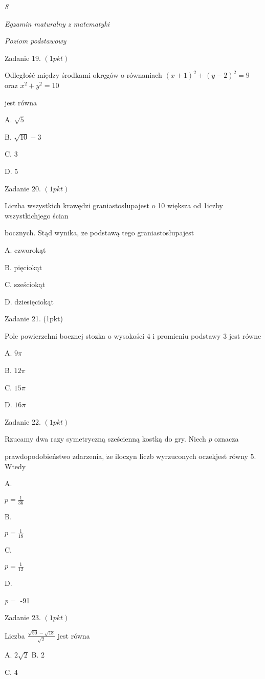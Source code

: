 \documentclass[a4paper,12pt]{article}
\begin{document}
{\it 8}

{\it Egzamin maturalny z matematyki}

{\it Poziom podstawowy}

Zadanie 19. $(1pkt)$

Odległość między środkami okręgów o równaniach $(x+1)^{2}+(y-2)^{2}=9$ oraz $x^{2}+y^{2}=10$

jest równa

A. $\sqrt{5}$

B. $\sqrt{10}-3$

C. 3

D. 5

Zadanie 20. $(1pkt)$

Liczba wszystkich krawędzi graniastosłupajest o 10 większa od 1iczby wszystkichjego ścian

bocznych. Stąd wynika, $\dot{\mathrm{z}}\mathrm{e}$ podstawą tego graniastosłupajest

A. czworokąt

B. pięciokąt

C. sześciokąt

D. dziesięciokąt

Zadanie 21. (1pkt)

Pole powierzchni bocznej stozka o wysokości 4 i promieniu podstawy 3 jest równe

A. $ 9\pi$

B. $ 12\pi$

C. $ 15\pi$

D. $ 16\pi$

Zadanie 22. $(1pkt)$

Rzucamy dwa razy symetryczną sześcienną kostką do gry. Niech $p$ oznacza

prawdopodobieństwo zdarzenia, $\dot{\mathrm{z}}\mathrm{e}$ iloczyn liczb wyrzuconych oczekjest równy 5. Wtedy

A.

$p=\displaystyle \frac{1}{36}$

B.

$p=\displaystyle \frac{1}{18}$

C.

$p=\displaystyle \frac{1}{12}$

D.

{\it p}$=$ -91

Zadanie 23. $(1pkt)$

Liczba $\displaystyle \frac{\sqrt{50}-\sqrt{18}}{\sqrt{2}}$ jest równa

A. $2\sqrt{2}$ B. 2

C. 4
\end{document}

